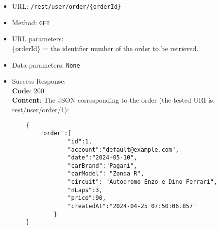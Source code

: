 \begin{itemize}
	\item URL: \texttt{/rest/user/order/\{orderId\}}
	\item Method: \texttt{GET}
	\item URL parameters:
		\\\{orderId\} = the identifier number of the order to be retrieved.
	\item Data parameters: \texttt{None}
	\item Success Response: \\
	\textbf{Code}: 200\\
	\textbf{Content}: The JSON corresponding to the order (the tested URI is: rest/user/order/1):
	\\\begin{verbatim}
	{
		"order":{
				"id":1,
				"account":"default@example.com",
				"date":"2024-05-10",
				"carBrand":"Pagani",
				"carModel": "Zonda R",
				"circuit": "Autodromo Enzo e Dino Ferrari",
				"nLaps":3,
				"price":90,
				"createdAt":"2024-04-25 07:50:06.857"
			}
	}
	\end{verbatim}


\end{itemize}
